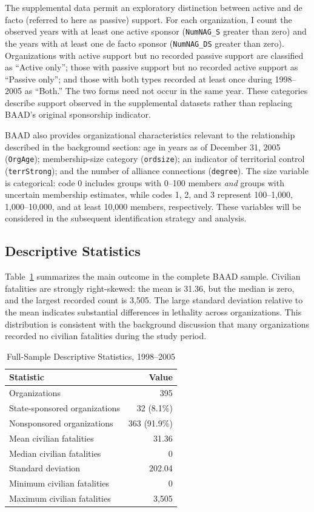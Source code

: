 \documentclass{article}
\begin{document}
The supplemental data permit an exploratory distinction between active and de facto (referred to here as passive) support. For each organization, I count the observed years with at least one active sponsor (\texttt{NumNAG\_S} greater than zero) and the years with at least one de facto sponsor (\texttt{NumNAG\_DS} greater than zero). Organizations with active support but no recorded passive support are classified as ``Active only''; those with passive support but no recorded active support as ``Passive only''; and those with both types recorded at least once during 1998--2005 as ``Both.'' The two forms need not occur in the same year. These categories describe support observed in the supplemental datasets rather than replacing BAAD's original sponsorship indicator.

BAAD also provides organizational characteristics relevant to the relationship described in the background section: age in years as of December 31, 2005 (\texttt{OrgAge}); membership-size category (\texttt{ordsize}); an indicator of territorial control (\texttt{terrStrong}); and the number of alliance connections (\texttt{degree}). The size variable is categorical: code 0 includes groups with 0--100 members \emph{and} groups with uncertain membership estimates, while codes 1, 2, and 3 represent 100--1,000, 1,000--10,000, and at least 10,000 members, respectively. These variables will be considered in the subsequent identification strategy and analysis.

\subsection{Descriptive Statistics}

Table~\ref{tab:full_sample} summarizes the main outcome in the complete BAAD sample. Civilian fatalities are strongly right-skewed: the mean is 31.36, but the median is zero, and the largest recorded count is 3,505. The large standard deviation relative to the mean indicates substantial differences in lethality across organizations. This distribution is consistent with the background discussion that many organizations recorded no civilian fatalities during the study period.

\begin{table}[htbp]
\centering
\caption{Full-Sample Descriptive Statistics, 1998--2005}
\label{tab:full_sample}
\begin{tabular}{lr}
\hline
Statistic & Value \\
\hline
Organizations & 395 \\
State-sponsored organizations & 32 (8.1\%) \\
Nonsponsored organizations & 363 (91.9\%) \\
Mean civilian fatalities & 31.36 \\
Median civilian fatalities & 0 \\
Standard deviation & 202.04 \\
Minimum civilian fatalities & 0 \\
Maximum civilian fatalities & 3,505 \\
\hline
\end{tabular}
\end{table}
\end{document}

